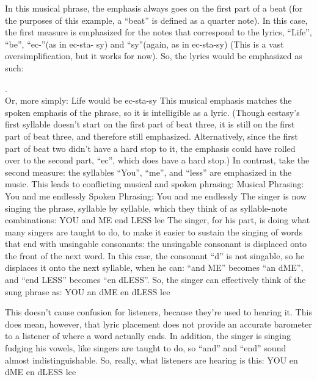 \documentclass[10pt,oneside]{memoir}
\begin{document}
In this musical phrase, the emphasis always goes on the first part of a beat (for the purposes of this example, a ``beat'' is defined as a quarter note).
In this case, the first measure is emphasized for the notes that correspond to the lyrics, ``Life'', ``be'', ``ec-''(as in ec-sta- sy) and ``sy''(again, as in ec-sta-sy) (This is a vast oversimplification, but it works for now). So, the lyrics would be emphasized as such:
\begin{figure}
\begin{center}
\end{center}
\label{page2image44544.png}
\end{figure}

    . \\
Or, more simply:
Life would be ec-sta-sy
This musical emphasis matches the spoken emphasis of the phrase, so it is intelligible as a lyric. (Though ecstasy's first syllable doesn't start on the first part of beat three, it is still on the first part of beat three, and therefore still emphasized. Alternatively, since the first part of beat two didn't have a hard stop to it, the emphasis could have rolled over to the second part, ``ec'', which does have a hard stop.)
In contrast, take the second measure: the syllables ``You'', ``me'', and ``less'' are emphasized in the music. This leads to conflicting musical and spoken phrasing:
Musical Phrasing: You and me endlessly 
Spoken Phrasing: You and me endlessly
The singer is now singing the phrase, syllable by syllable, which they think of as syllable-note combinations:
YOU and ME end LESS lee
The singer, for his part, is doing what many singers are taught to do, to make it easier to sustain the singing of words that end with unsingable consonants: the unsingable consonant is displaced onto the front of the next word. In this case, the consonant ``d'' is not singable, so he displaces it onto the next syllable, when he can: ``and ME'' becomes ``an dME'', and ``end LESS'' becomes ``en dLESS''. So, the singer can effectively think of the sung phrase as:
YOU an dME en dLESS lee


This doesn't cause confusion for listeners, because they're used to hearing it. This does mean, however, that lyric placement does not provide an accurate barometer to a listener of where a word actually ends.
In addition, the singer is singing fudging his vowels, like singers are taught to do, so ``and'' and ``end'' sound almost indistinguishable. So, really, what listeners are hearing is this:
YOU en dME en dLESS lee
\end{document}
